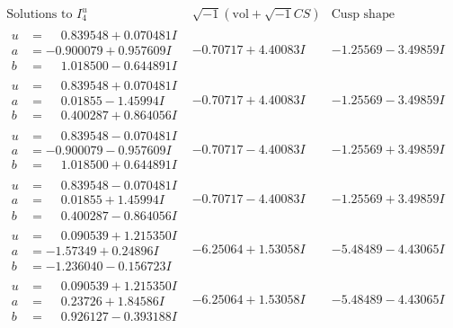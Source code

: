 \documentclass[1p]{elsarticle_modified}
\theoremstyle{definition}
\newcommand{\I}{\sqrt{-1}}
\begin{document}
$$\begin{array}{c|c|c}  
\text{Solutions to }I^u_{4}& \I (\text{vol} + \sqrt{-1}CS) & \text{Cusp shape}\\
 \hline 
\begin{aligned}
u &= \phantom{-}0.839548 + 0.070481 I \\
a &= -0.900079 + 0.957609 I \\
b &= \phantom{-}1.018500 - 0.644891 I\end{aligned}
 & -0.70717 + 4.40083 I & -1.25569 - 3.49859 I \\ \hline\begin{aligned}
u &= \phantom{-}0.839548 + 0.070481 I \\
a &= \phantom{-}0.01855 - 1.45994 I \\
b &= \phantom{-}0.400287 + 0.864056 I\end{aligned}
 & -0.70717 + 4.40083 I & -1.25569 - 3.49859 I \\ \hline\begin{aligned}
u &= \phantom{-}0.839548 - 0.070481 I \\
a &= -0.900079 - 0.957609 I \\
b &= \phantom{-}1.018500 + 0.644891 I\end{aligned}
 & -0.70717 - 4.40083 I & -1.25569 + 3.49859 I \\ \hline\begin{aligned}
u &= \phantom{-}0.839548 - 0.070481 I \\
a &= \phantom{-}0.01855 + 1.45994 I \\
b &= \phantom{-}0.400287 - 0.864056 I\end{aligned}
 & -0.70717 - 4.40083 I & -1.25569 + 3.49859 I \\ \hline\begin{aligned}
u &= \phantom{-}0.090539 + 1.215350 I \\
a &= -1.57349 + 0.24896 I \\
b &= -1.236040 - 0.156723 I\end{aligned}
 & -6.25064 + 1.53058 I & -5.48489 - 4.43065 I \\ \hline\begin{aligned}
u &= \phantom{-}0.090539 + 1.215350 I \\
a &= \phantom{-}0.23726 + 1.84586 I \\
b &= \phantom{-}0.926127 - 0.393188 I\end{aligned}
 & -6.25064 + 1.53058 I & -5.48489 - 4.43065 I \\ \hline\begin{aligned}

\end{aligned}
\end{array}$$
\end{document}
